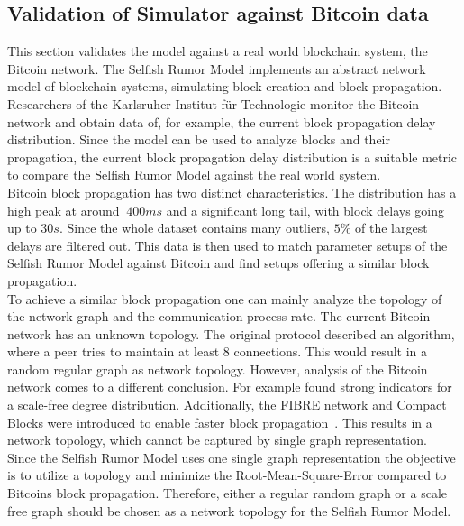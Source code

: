 \subsection{Validation of Simulator against Bitcoin data}
This section validates the model against a real world blockchain system, the Bitcoin network. The Selfish Rumor Model implements an abstract network model of blockchain systems, simulating block creation and block propagation.
Researchers of the Karlsruher Institut für Technologie \cite{BitcoinNetworkMonitor} monitor the Bitcoin network and obtain data of, for example, the current block propagation delay distribution. Since the model can be used to analyze blocks and their propagation, the current block propagation delay distribution is a suitable metric to compare the Selfish Rumor Model against the real world system.\\
Bitcoin block propagation has two distinct characteristics. The distribution has a high peak at around $~400ms$ and a significant long tail, with block delays going up to $30s$. Since the whole dataset contains many outliers, $5\% $ of the largest delays are filtered out. This data is then used to match parameter setups of the Selfish Rumor Model against Bitcoin and find setups offering a similar block propagation.\\
To achieve a similar block propagation one can mainly analyze the topology of the network graph and the communication process rate.
The current Bitcoin network has an unknown topology. The original protocol described an algorithm, where a peer tries to maintain at least 8 connections. This would result in a random regular graph as network topology. However, analysis of the Bitcoin network comes to a different conclusion.
For example  found strong indicators for a scale-free degree distribution.
Additionally, the FIBRE network and Compact Blocks were introduced to enable faster block propagation~\cite{measurement}. This results in a network topology, which cannot be captured by single graph representation.\\
Since the Selfish Rumor Model uses one single graph representation the objective is to utilize a topology and minimize the Root-Mean-Square-Error compared to Bitcoins block propagation. Therefore, either a regular random graph or a scale free graph should be chosen as a network topology for the Selfish Rumor Model. 
